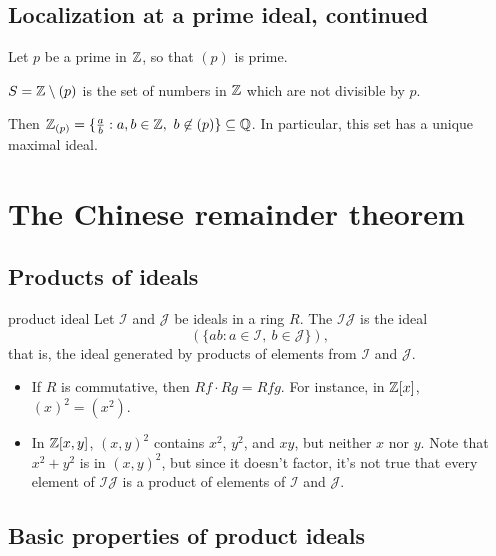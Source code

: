 \documentclass[12pt,letterpaper]{report}
\begin{document}
\pagebreak
\subsection{Localization at a prime ideal, continued}

\begin{ex}
  Let $p$ be a prime in $\mathbb{Z}$, so that $(p)$ is prime.

  $S = \mathbb{Z} \setminus (p)$ is the set of numbers in $\mathbb{Z}$ which are not divisible by $p$.

  Then $\mathbb{Z}_{(p)} = \{\frac{a}{b} : a, b \in \mathbb{Z}, \ b \not\in (p)\} \subseteq \mathbb{Q}$.
  In particular, this set has a unique maximal ideal.
\end{ex}

\section{The Chinese remainder theorem}

\subsection{Products of ideals}

\begin{defn}{product ideal}{}
  Let $\mathcal{I}$ and $\mathcal{J}$ be ideals in a ring $R$.
  The  $\mathcal{IJ}$ is the ideal
  \[ (\{ ab : a \in \mathcal{I}, \ b \in \mathcal{J} \}), \]
  that is, the ideal generated by products of elements from $\mathcal{I}$ and $\mathcal{J}$.
\end{defn}

\begin{ex}
  \begin{itemize}
    \item If $R$ is commutative, then $Rf \cdot Rg = Rfg$.
    For instance, in $\mathbb{Z}[x]$, $(x)^2 = (x^2)$.
    \item In $\mathbb{Z}[x, y]$, $(x, y)^2$ contains $x^2$, $y^2$, and $xy$, but neither $x$ nor $y$.
    Note that $x^2 + y^2$ is in $(x, y)^2$, but since it doesn't factor, it's not true that every
    element of $\mathcal{IJ}$ is a product of elements of $\mathcal{I}$ and $\mathcal{J}$.
  \end{itemize}
\end{ex}

\pagebreak
\subsection{Basic properties of product ideals}
\end{document}
